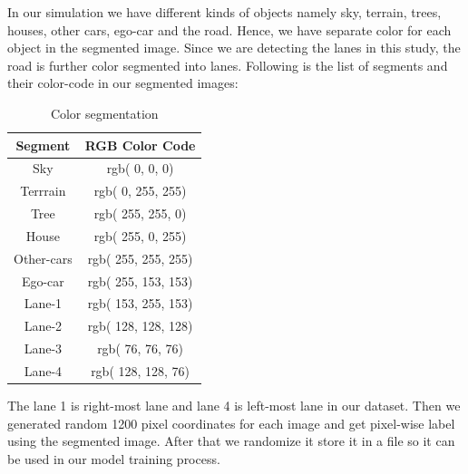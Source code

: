 In our simulation we have different kinds of objects namely sky, terrain, trees, houses, other cars, ego-car and the road. Hence, we have separate color for each object in the segmented image. Since we are detecting the lanes in this study, the road is further color segmented into lanes. Following is the list of segments and their color-code in our segmented images:

\begin{table}[H]
  \centering
  \begin{tabular}{ |c|c| }
    \hline
    \textbf{Segment} & \textbf{RGB Color Code} \\
    \hline
    Sky & rgb(   0,   0,   0) \\
    \hline
    Terrrain & rgb(   0, 255, 255) \\
    \hline
    Tree & rgb( 255, 255,   0) \\
    \hline
    House & rgb( 255,   0, 255) \\
    \hline
    Other-cars & rgb( 255, 255, 255) \\
    \hline
    Ego-car & rgb( 255, 153, 153) \\
    \hline
    Lane-1 & rgb( 153, 255, 153) \\
    \hline
    Lane-2 & rgb( 128, 128, 128) \\
    \hline
    Lane-3 & rgb(  76,  76,  76) \\
    \hline
    Lane-4 & rgb( 128, 128,  76) \\
    \hline
  \end{tabular}
\caption{Color segmentation}
\label{color_code}
\end{table}

The lane 1 is right-most lane and lane 4 is left-most lane in our dataset. Then we generated random 1200 pixel coordinates for each image and get pixel-wise label using the segmented image. After that we randomize it store it in a file so it can be used in our model training process.